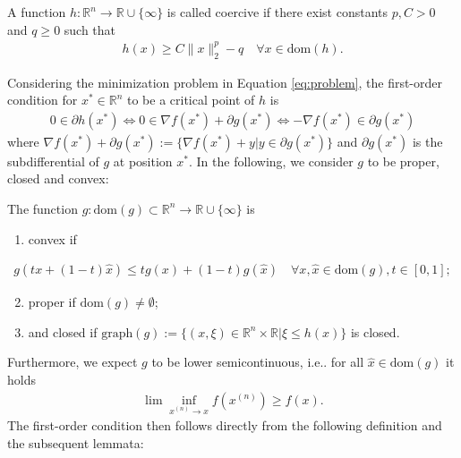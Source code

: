 \documentclass[onecolumn,final,a4paper,13pt,reqno]{siamart}
\makeatletter
\DeclareRobustCommand\onedot{\futurelet\@let@token\@onedot}
\def\@onedot{\ifx\@let@token.\else.\null\fi\xspace}
\def\ie{{i.e}\onedot} \def\Ie{{I.e}\onedot}
\def\dom{\text{dom}}
\makeatother
\begin{document}
\begin{definitionmd}
	A function $h: \mathbb{R}^n \rightarrow \mathbb{R} \cup \{\infty\}$ is called coercive if there exist constants $p, C > 0$ and $q \geq 0$ such that
	\begin{align}
		h(x) \geq C \|x\|_2^p - q\quad \forall x \in \dom(h).
	\end{align}
\end{definitionmd}

Considering the minimization problem in Equation \eqref{eq:problem}, the first-order condition for $x^\ast \in \mathbb{R}^n$ to be a critical point of $h$ is
\begin{align}
	0 \in \partial h(x^\ast) \Leftrightarrow 0 \in \nabla f(x^\ast) + \partial g(x^\ast) \Leftrightarrow - \nabla f(x^\ast) \in \partial g(x^\ast)
\end{align}
where $\nabla f(x^\ast) + \partial g(x^\ast) := \{ \nabla f(x^\ast) + y | y \in \partial g(x^\ast)\}$ and $\partial g(x^\ast)$ is the subdifferential of $g$ at position $x^\ast$. In the following, we consider $g$ to be proper, closed and convex:

\begin{definitionmd}
	The function $g : \dom(g) \subset \mathbb{R}^n \rightarrow \mathbb{R} \cup \{\infty\}$ is
	\begin{enumerate}[label=(\alph*)]
		\item convex if
	\end{enumerate}
	\begin{align}
		g(tx + (1 - t)\hat{x}) \leq tg(x) + (1- t)g(\hat{x})\quad\forall x,\hat{x} \in \dom(g), t \in [0,1];
	\end{align}
	\begin{enumerate}[label=(\alph*)]
		\setcounter{enumi}{1}
		\item proper if $\dom(g) \neq \emptyset$;
		\item and closed if $\text{graph}(g) := \{(x, \xi) \in \mathbb{R}^n \times \mathbb{R} | \xi \leq h(x)\}$ is closed.
	\end{enumerate}
\end{definitionmd}

Furthermore, we expect $g$ to be lower semicontinuous, \ie for all $\hat{x} \in \dom(g)$ it holds
\begin{align}
	\lim\inf_{x^{(n)} \rightarrow x} f(x^{(n)}) \geq f(x).
\end{align}
The first-order condition then follows directly from the following definition and the subsequent lemmata:
\end{document}
